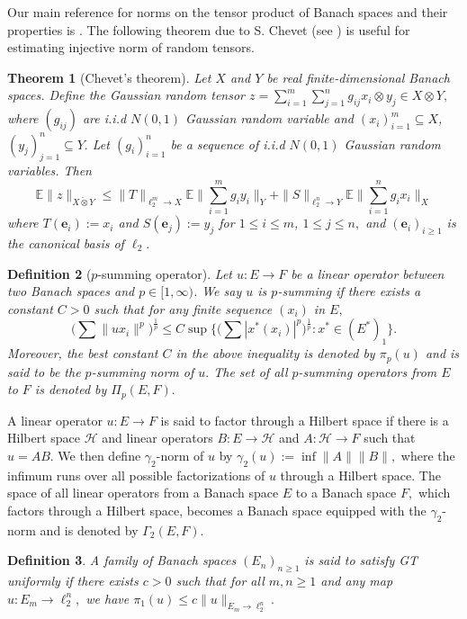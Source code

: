 \documentclass[a4paper,oneside,11pt, reqno]{amsart}
\numberwithin{equation}{section}
\newtheorem{theorem}{Theorem}[section]
\newtheorem{definition}[theorem]{Definition}
\theoremstyle{plain}
\begin{document}
Our main reference for norms on the tensor product of Banach spaces and their properties is \cite{Raymond02}.
The following theorem due to S. Chevet (see \cite[Theorem 3.20]{LT}) is useful for estimating injective norm of random tensors.
\begin{theorem}[Chevet's theorem] \label{chevet}
Let $X$ and $Y$ be real finite-dimensional Banach spaces. Define the Gaussian random tensor $z=\sum_{i=1}^m\sum_{j=1}^ng_{ij}x_i\otimes y_j\in X\otimes Y,$ where $(g_{ij})$ are i.i.d $N(0,1)$ Gaussian random variable and $(x_i)_{i=1}^m\subseteq X$, $(y_j)_{j=1}^n\subseteq Y.$ Let $(g_i)_{i=1}^n$ be a sequence of i.i.d $N(0,1)$ Gaussian random variables. Then \[\mathbb{E}\|z\|_{X\check{\otimes}Y}\leqslant \|T\|_{\ell_2^m\to X}\mathbb{E}\Big\|\sum_{i=1}^mg_iy_i\Big\|_{Y}+\|S\|_{\ell_2^n\to Y}\mathbb{E}\Big\|\sum_{i=1}^ng_ix_i\Big\|_{X}\] where $T(\mathbf{e}_i):=x_i$ and $S(\mathbf{e}_j):=y_j$ for $1\leqslant i\leqslant m$, $1\leqslant j\leqslant n,$ and $(\mathbf{e}_i)_{i\geqslant 1}$ is the canonical basis of $\ell_2.$ 
\end{theorem}
\begin{definition}[$p$-summing operator]
Let $u:E\to F$ be a linear operator between two Banach spaces and $p\in [1,\infty)$. We say $u$ is $p$-summing if there exists a constant $C>0$ such that for any finite sequence $(x_i)$ in $E,$
$$\Big(\sum\|ux_i\|^p\Big)^{\frac{1}{p}}\leqslant C\sup\Big\{\big(\sum|x^*(x_i)|^p\big)^{\frac{1}{p}}:x^*\in (E^*)_1\Big\}.$$ 
Moreover, the best constant $C$ in the above inequality is denoted by $\pi_p(u)$ and is said to be the $p$-summing norm of $u.$ The set of all $p$-summing operators from $E$ to $F$ is denoted by $\Pi_p(E,F).$
\end{definition}
A linear operator $u:E\to F$ is said to factor through a Hilbert space if there is a Hilbert space $\mathcal H$  and linear operators $B:E\to\mathcal H$ and $A:\mathcal H\to F$ such that $u=AB$. We then define $\gamma_2$-norm of $u$ by $\gamma_2(u):=\inf\|A\|\|B\|,$ where the infimum runs over all possible factorizations of $u$ through a Hilbert space. The space of all linear operators from a Banach space $E$ to a Banach space $F,$ which factors through a Hilbert space, becomes a Banach space equipped with the $\gamma_2$-norm and is denoted by $\Gamma_2(E,F).$
\begin{definition} \label{GTunif}
 A family of Banach spaces $(E_n)_{n\geqslant 1}$ is said to satisfy GT uniformly if there exists $c>0$ such that for all $m,n\geqslant 1$ and any map $u:E_m\to\ell_2^n,$ we have $\pi_1(u)\leqslant c\|u\|_{E_m\to\ell_2^n}.$
\end{definition}
\end{document}
